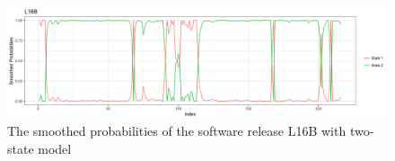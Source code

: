 \begin{figure}[H]
\begin{centering}
\includegraphics[scale=0.35]{picture/L16B_2_smo1}
\par\end{centering}
\caption{The smoothed probabilities of the software release L16B with two-state
model}
\label{L16B_2_smo}
\end{figure}

